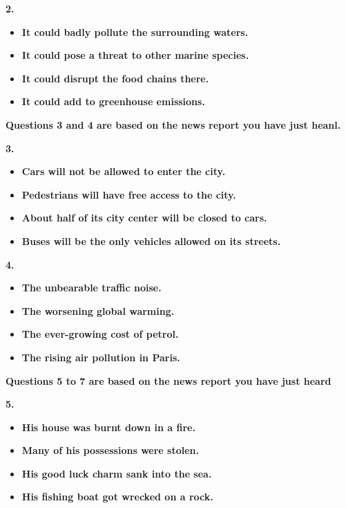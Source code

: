 \documentclass[UTF8,11pt]{ctexart}
\begin{document}
\textbf{2.}


\begin{itemize}[leftmargin=2em,itemsep=.2em,topsep=.4em]\item[A.] \textbf{It could badly pollute the surrounding waters.}
\item[B.] \textbf{It could pose a threat to other marine species.}
\item[C.] \textbf{It could disrupt the food chains there.}
\item[D.] \textbf{It could add to greenhouse emissions.}
\end{itemize}

\textbf{Questions 3 and 4 are based on the news report you have just heanl.}


\textbf{3.}


\begin{itemize}[leftmargin=2em,itemsep=.2em,topsep=.4em]\item[A.] \textbf{Cars will not be allowed to enter the city.}
\item[B.] \textbf{Pedestrians will have free access to the city.}
\item[C.] \textbf{About half of its city center will be closed to cars.}
\item[D.] \textbf{Buses will be the only vehicles allowed on its streets.}
\end{itemize}

\textbf{4.}


\begin{itemize}[leftmargin=2em,itemsep=.2em,topsep=.4em]\item[A.] \textbf{The unbearable traffic noise.}
\item[B.] \textbf{The worsening global warming.}
\item[C.] \textbf{The ever-growing cost of petrol.}
\item[D.] \textbf{The rising air pollution in Paris.}
\end{itemize}

\textbf{Questions 5 to 7 are based on the news report you have just heard}


\textbf{5.}


\begin{itemize}[leftmargin=2em,itemsep=.2em,topsep=.4em]\item[A.] \textbf{His house was burnt down in a fire.}
\item[B.] \textbf{Many of his possessions were stolen.}
\item[C.] \textbf{His good luck charm sank into the sea.}
\item[D.] \textbf{His fishing boat got wrecked on a rock.}
\end{itemize}
\end{document}
